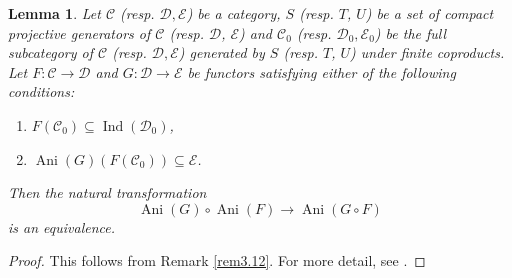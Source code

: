 \documentclass[11pt, a4paper]{amsart}
\theoremstyle{plain}
\newtheorem{lemma}[theorem]{Lemma}
\theoremstyle{definition}
\begin{document}
\begin{lemma}\label{lem3.13}
    Let $\mathscr C$ (resp. $\mathscr D, \mathscr E$) be a category, $S$ (resp. $T$, $U$) be a set of compact projective generators of $\mathscr C$ (resp. $\mathscr D$, $\mathscr E$) and $\mathscr C_0$ (resp. $\mathscr D_0, \mathscr E_0$) be the full subcategory of $\mathscr C$ (resp. $\mathscr D, \mathscr E$) generated by $S$ (resp. $T$, $U$) under finite coproducts. Let $F:\mathscr C\to \mathscr D$ and $G:\mathscr D\to \mathscr E$ be functors satisfying either of the following conditions:\begin{enumerate}
        \item $F(\mathscr C_0)\subseteq \operatorname{Ind}(\mathscr D_0)$,
        \item $\operatorname{Ani}(G)(F(\mathscr C_0))\subseteq \mathscr E$.
    \end{enumerate}
    Then the natural transformation\[\operatorname{Ani}(G)\circ \operatorname{Ani}(F)\to \operatorname{Ani}(G\circ F)\] is an equivalence.
\end{lemma}
\begin{proof}
    This follows from Remark \ref{rem3.12}. For more detail, see \cite[Proposition 5.1.5]{CS24}.
    
\end{proof}
\end{document}
